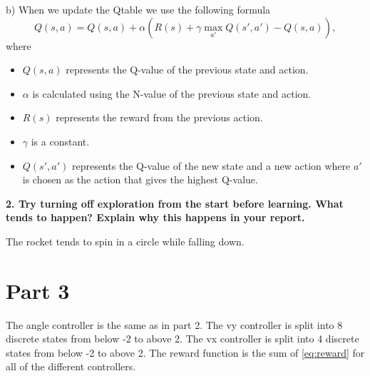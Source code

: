 \documentclass[a4paper,10pt]{article}
\begin{document}
b)
When we update the Qtable we use the following formula
\begin{equation*}
    Q(s, a) = Q(s, a) + \alpha(R(s) + \gamma \max_{a'}Q(s', a') - Q(s,a)),
\end{equation*}
where 
\begin{itemize}
    \item $Q(s, a)$ represents the Q-value of the previous state and action.
    \item $\alpha$ is calculated using the N-value of the previous state and action.
    \item $R(s)$ represents the reward from the previous action.
    \item $\gamma$ is a constant. 
    \item $Q(s', a')$ represents the Q-value of the new state and a new action where $a'$
    is chosen as the action that gives the highest Q-value.
\end{itemize}

\textbf{2. Try turning off exploration from the start before learning.
  What tends to happen? Explain why this happens in your report.}

The rocket tends to spin in a circle while falling down.

\section*{Part 3}

The angle controller is the same as in part 2.
The vy controller is split into 8 discrete states from below -2 to above 2.
The vx controller is split into 4 discrete states from below -2 to above 2.
The reward function is the sum of \ref{eq:reward} for all of the different controllers.
\end{document}
